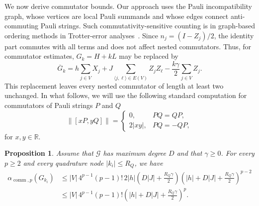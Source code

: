 \documentclass[10pt,reqno]{article}
\numberwithin{equation}{section}
\theoremstyle{plain}
\newtheorem{prop}[thm]{Proposition}
\theoremstyle{definition}
\newcommand{\R}{\mathbb{R}}
\begin{document}
We now derive commutator bounds. Our approach uses the Pauli incompatibility graph, whose vertices are local Pauli summands and whose edges connect anti-commuting Pauli strings. Such commutativity-sensitive counting is in graph-based ordering methods in Trotter-error analyses~\cite{tranter2019ordering}. Since \(n_j=(I-Z_j)/2\), the identity part commutes with all terms and does not affect nested commutators. Thus, for commutator estimates, \(G_k=H+kL\) may be replaced by
\begin{equation}
\overline G_k = h\sum_{j\in V}X_j + J\sum_{\langle j,\ell\rangle\in E(V)}Z_jZ_\ell - \frac{k\gamma}{2}\sum_{j\in V}Z_j .
\label{eq:tfim-Gbar-k-def}
\end{equation}
This replacement leaves every nested commutator of length at least two unchanged. In what follows, we will use the following standard computation for commutators of Pauli strings \(P\) and \(Q\)
\begin{equation}
\|[xP,yQ]\| = \begin{cases} 0, & PQ=QP,\\ 2|xy|, & PQ=-QP, \end{cases}
\label{eq:pauli-commutator-norm}
\end{equation}
for $x,y \in \R$. 

\begin{prop}
\label{prop:tfim-graph-commutator-bound}
Assume that \(\mathcal G\) has maximum degree \(D\) and that \(\gamma\geq0\). For every \(p\geq2\) and every quadrature node \(|k_i|\leq R_Q\), we have
\begin{align}
\alpha_{\operatorname{comm},p}(G_{k_i}) &\leq  |V|\,4^{p-1}(p-1)! \,2|h| \left(D|J|+\frac{R_Q\gamma}{2}\right) \left(|h|+D|J|+\frac{R_Q\gamma}{2}\right)^{p-2} \\ &\leq |V|\,4^{p-1}(p-1)! \left(|h|+D|J|+\frac{R_Q\gamma}{2}\right)^p .
\label{eq:tfim-alpha-comm-graph-bound}
\end{align}
\end{prop}
\end{document}
